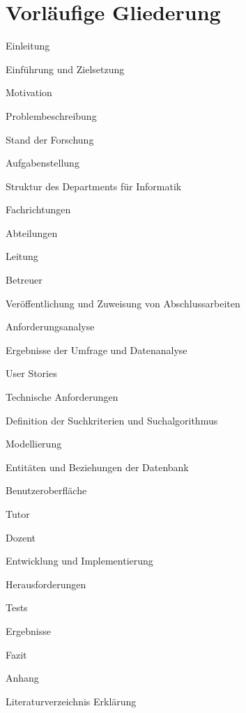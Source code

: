 \chapter{Vorläufige Gliederung}

\begin{legal}[noitemsep]
\item Einleitung
	\begin{legal}
	\item Einführung und Zielsetzung
	\item Motivation
	\item Problembeschreibung
	\item Stand der Forschung
	\item Aufgabenstellung
	\end{legal}
\item Struktur des Departments für Informatik
	\begin{legal}
	\item Fachrichtungen
		\begin{legal}
		\item  Abteilungen
			\begin{legal}
			\item  Leitung
			\item  Betreuer
			\item  Veröffentlichung und Zuweisung von Abschlussarbeiten
			\end{legal}
		\end{legal}
	\end{legal}
\item Anforderungsanalyse
	\begin{legal}
	\item Ergebnisse der Umfrage und Datenanalyse
	\item User Stories
	\item Technische Anforderungen
	\item Definition der Suchkriterien und Suchalgorithmus
	\item Modellierung
		\begin{legal}
		\item  Entitäten und Beziehungen der Datenbank
		\item  Benutzeroberfläche
			\begin{legal}
			\item  Tutor
			\item  Dozent
			\end{legal}
		\end{legal}
	\end{legal}
\item Entwicklung und Implementierung
	\begin{legal}
	\item Herausforderungen
	\item Tests
	\item Ergebnisse
	\end{legal}
\item Fazit
\item Anhang
\item Literaturverzeichnis
Erklärung
\end{legal}